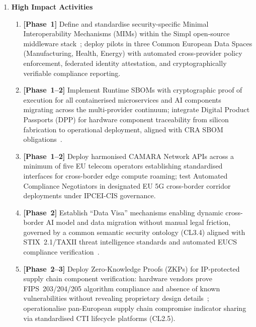\begin{enumerate}
\item \textbf{High Impact Activities}

\begin{enumerate}[label=(\alph*)]
  \item \textbf{[Phase~1]} Define and standardise security-specific Minimal
        Interoperability Mechanisms (MIMs) within the Simpl open-source middleware
        stack~\cite{cloud_edge_roadmap}; deploy pilots in three Common European Data
        Spaces (Manufacturing, Health, Energy) with automated cross-provider policy
        enforcement, federated identity attestation, and cryptographically verifiable
        compliance reporting.

  \item \textbf{[Phase~1--2]} Implement Runtime SBOMs with cryptographic proof of
        execution for all containerised microservices and AI components migrating across
        the multi-provider continuum; integrate Digital Product Passports (DPP) for
        hardware component traceability from silicon fabrication to operational
        deployment, aligned with CRA SBOM obligations~\cite{cra}.

  \item \textbf{[Phase~1--2]} Deploy harmonised CAMARA Network APIs across a minimum
        of five EU telecom operators establishing standardised interfaces for cross-border
        edge compute roaming; test Automated Compliance Negotiators in designated EU
        5G cross-border corridor deployments under IPCEI-CIS governance.

  \item \textbf{[Phase~2]} Establish ``Data Visa'' mechanisms enabling dynamic
        cross-border AI model and data migration without manual legal friction, governed
        by a common semantic security ontology (CL3.4) aligned with STIX~2.1/TAXII
        threat intelligence standards and automated EUCS compliance verification~\cite{eucs}.

  \item \textbf{[Phase~2--3]} Deploy Zero-Knowledge Proofs (ZKPs) for IP-protected
        supply chain component verification: hardware vendors prove FIPS~203/204/205
        algorithm compliance and absence of known vulnerabilities without revealing
        proprietary design details~\cite{fips203,fips204,fips205}; operationalise
        pan-European supply chain compromise indicator sharing via standardised
        CTI lifecycle platforms (CL2.5).
\end{enumerate}


\end{enumerate}
